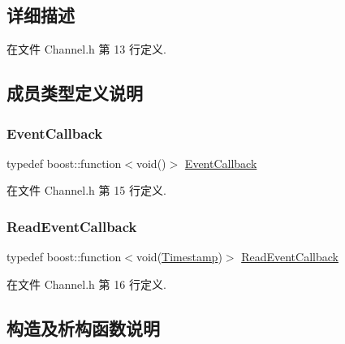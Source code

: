 \subsection{详细描述}


在文件 Channel.\+h 第 13 行定义.



\subsection{成员类型定义说明}
\mbox{\label{classmuduo_1_1Channel_aba4530f63bcce7091a51e66d01f4d2cb}} 
\subsubsection{\texorpdfstring{Event\+Callback}{EventCallback}}
{\footnotesize\ttfamily typedef boost\+::function$<$void()$>$ \hyperlink{classmuduo_1_1Channel_aba4530f63bcce7091a51e66d01f4d2cb}{Event\+Callback}}



在文件 Channel.\+h 第 15 行定义.

\mbox{\label{classmuduo_1_1Channel_a9523d5df2fdb848727cf98870dba0000}} 
\subsubsection{\texorpdfstring{Read\+Event\+Callback}{ReadEventCallback}}
{\footnotesize\ttfamily typedef boost\+::function$<$void(\hyperlink{classmuduo_1_1Timestamp}{Timestamp})$>$ \hyperlink{classmuduo_1_1Channel_a9523d5df2fdb848727cf98870dba0000}{Read\+Event\+Callback}}



在文件 Channel.\+h 第 16 行定义.



\subsection{构造及析构函数说明}
\mbox{\label{classmuduo_1_1Channel_a51d49371e765dcf30535b38b68bb80b6}} 
